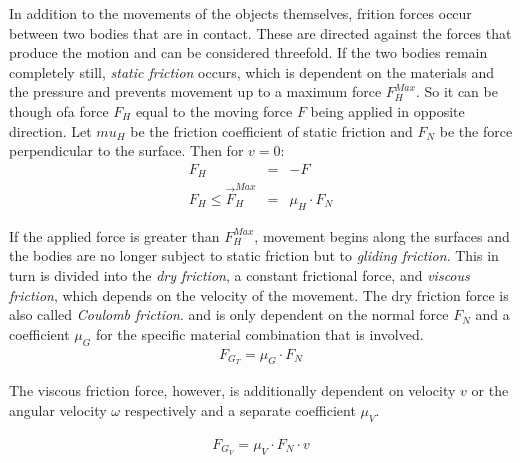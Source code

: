 \documentclass[10pt,a4paper]{article}
\begin{document}
In addition to the movements of the objects themselves, frition forces occur between two bodies that are in contact. These are directed against the forces that produce the motion and can be considered threefold.
If the two bodies remain completely still, \textit{static friction} occurs, which is dependent on the materials and the pressure and prevents movement up to a maximum force $F_H^{Max}$.
So it can be though ofa force $F_H$ equal to the moving force $F$ being applied in opposite direction.
Let $mu_H$ be the friction coefficient of static friction and $F_N$ be the force perpendicular to the
surface. Then for $v = 0$:
\begin{eqnarray}
    F_H & = & -F \\
    F_H \le \vec F_H^{Max} & = & \mu_H \cdot F_N
\end{eqnarray}

If the applied force is greater than $F_H^{Max}$, movement begins along the surfaces and the bodies
are no longer subject to static friction but to \textit{gliding friction}.
This in turn is divided into the \textit {dry friction}, a constant frictional force,
and \textit{viscous friction}, which depends on the velocity of the movement.
The dry friction force is also called \textit{Coulomb friction}.
and is only dependent on the normal force $F_N$ and a coefficient $\mu_G$ for the
specific material combination that is involved.
\begin{eqnarray}
    F_{G_T} = \mu_G \cdot F_N
\end{eqnarray}

The viscous friction force, however, is additionally dependent on velocity $v$ or the
angular velocity $\omega$ respectively and a separate coefficient $\mu_V$.

\begin{eqnarray}
    F_{G_V} = \mu_V \cdot F_N \cdot v
\end{eqnarray}
\end{document}
